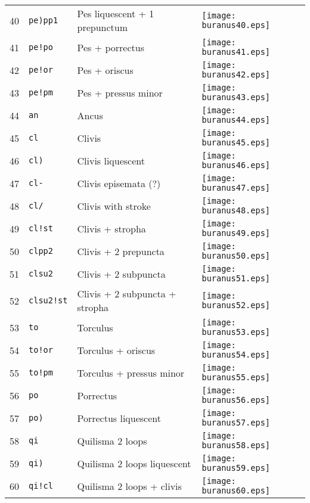 \documentclass{scrarticle}
\begin{document}
\begin{longtable}{l|l|l|l}
40 & \texttt{pe)pp1} & Pes liquescent + 1 prepunctum & \texttt{[image: buranus40.eps]} \\
41 & \texttt{pe!po} & Pes + porrectus & \texttt{[image: buranus41.eps]} \\
42 & \texttt{pe!or} & Pes + oriscus & \texttt{[image: buranus42.eps]} \\
43 & \texttt{pe!pm} & Pes + pressus minor & \texttt{[image: buranus43.eps]} \\
44 & \texttt{an} & Ancus & \texttt{[image: buranus44.eps]} \\
45 & \texttt{cl} & Clivis & \texttt{[image: buranus45.eps]} \\
46 & \texttt{cl)} & Clivis liquescent & \texttt{[image: buranus46.eps]} \\
47 & \texttt{cl-} & Clivis episemata (?) & \texttt{[image: buranus47.eps]} \\
48 & \texttt{cl/} & Clivis with stroke & \texttt{[image: buranus48.eps]} \\
49 & \texttt{cl!st} & Clivis + stropha & \texttt{[image: buranus49.eps]} \\
50 & \texttt{clpp2} & Clivis + 2 prepuncta & \texttt{[image: buranus50.eps]} \\
51 & \texttt{clsu2} & Clivis + 2 subpuncta & \texttt{[image: buranus51.eps]} \\
52 & \texttt{clsu2!st} & Clivis + 2 subpuncta + stropha & \texttt{[image: buranus52.eps]} \\
53 & \texttt{to} & Torculus & \texttt{[image: buranus53.eps]} \\
54 & \texttt{to!or} & Torculus + oriscus & \texttt{[image: buranus54.eps]} \\
55 & \texttt{to!pm} & Torculus + pressus minor & \texttt{[image: buranus55.eps]} \\
56 & \texttt{po} & Porrectus & \texttt{[image: buranus56.eps]} \\
57 & \texttt{po)} & Porrectus liquescent & \texttt{[image: buranus57.eps]} \\
58 & \texttt{qi} & Quilisma 2 loops & \texttt{[image: buranus58.eps]} \\
59 & \texttt{qi)} & Quilisma 2 loops liquescent & \texttt{[image: buranus59.eps]} \\
60 & \texttt{qi!cl} & Quilisma 2 loops + clivis & \texttt{[image: buranus60.eps]} \\

\end{longtable}
\end{document}
